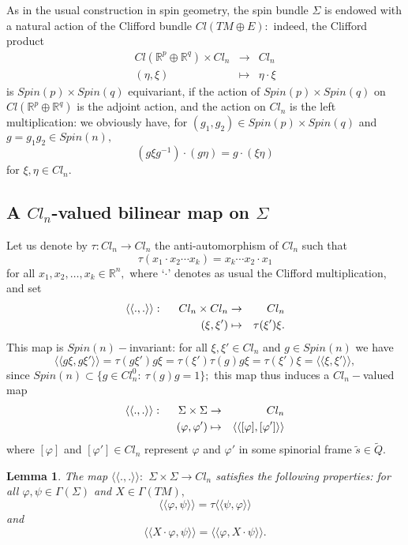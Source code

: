 \documentclass{amsart}
\newtheorem{lem}{Lemma}[section]
\begin{document}
As in the usual construction in spin geometry, the spin bundle $\Sigma$ is endowed with a natural action of the Clifford bundle $Cl(TM\oplus E):$ indeed, the Clifford product
\begin{eqnarray*}
Cl({\mathbb{R}}^p\oplus{\mathbb{R}}^q)\times Cl_n&\rightarrow& Cl_n\\
(\eta,\xi)&\mapsto& \eta\cdot\xi
\end{eqnarray*}
is $Spin(p)\times Spin(q)$ equivariant, if the action of $Spin(p)\times Spin(q)$ on $Cl({\mathbb{R}}^p\oplus{\mathbb{R}}^q)$ is the adjoint action, and the action on $Cl_n$ is the left multiplication: we obviously have, for $(g_1,g_2)\in Spin(p)\times Spin(q)$ and $g=g_1g_2\in Spin(n),$
$$(g\xi g^{-1})\cdot(g\eta)=g\cdot(\xi\eta)$$
for $\xi,\eta\in Cl_n.$ 

\subsection{A $Cl_n$-valued bilinear map on $\Sigma$}
Let us denote by $\tau:Cl_n\rightarrow Cl_n$ the anti-automorphism of $Cl_n$ such that
$$\tau(x_1\cdot x_2\cdots x_k)=x_k\cdots x_2\cdot x_1$$ 
for all $x_1,x_2,\ldots, x_k\in{\mathbb{R}}^n,$ where `$\cdot$'  denotes as usual the Clifford multiplication, and set
\begin{eqnarray}
\langle\langle.,.\rangle\rangle:\hspace{.5cm}Cl_n\times Cl_n&\rightarrow& Cl_n\label{def brackets 1}\\
(\xi,\xi')&\mapsto& \tau(\xi')\xi.\nonumber
\end{eqnarray}
This map is $Spin(n)-$invariant: for all $\xi,\xi'\in Cl_n$ and $g\in Spin(n)$ we have
$$\langle\langle g\xi,g\xi'\rangle\rangle=\tau(g\xi')g\xi= \tau(\xi')\tau(g)g\xi= \tau(\xi')\xi=\langle\langle \xi,\xi'\rangle\rangle,$$
since $Spin(n)\subset \{g\in Cl_n^0:\ \tau(g)g=1\};$ this map thus induces a $Cl_n-$valued map
\begin{eqnarray}
\langle\langle.,.\rangle\rangle:\hspace{.5cm}\Sigma\times \Sigma&\rightarrow& Cl_n\label{def brackets 2}\\
(\varphi,\varphi')&\mapsto& \langle\langle[\varphi],[\varphi']\rangle\rangle\nonumber
\end{eqnarray}
where $[\varphi]$ and $[\varphi']\in Cl_n$ represent $\varphi$ and $\varphi'$ in some spinorial frame $\tilde{s}\in\tilde{Q}.$
\begin{lem}
The map $\langle\langle.,.\rangle\rangle:$ $\Sigma\times \Sigma\rightarrow Cl_n$ satisfies the following properties: for all $\varphi,\psi\in\Gamma(\Sigma)$ and $X\in \Gamma(TM),$
\begin{equation}\label{scalar product property1}
\langle\langle \varphi,\psi\rangle\rangle=\tau\langle\langle\psi,\varphi\rangle\rangle
\end{equation}
and
\begin{equation}\label{scalar product property2}
\langle\langle X\cdot\varphi,\psi\rangle\rangle=\langle\langle\varphi,X\cdot \psi\rangle\rangle.
\end{equation}
\end{lem}
\end{document}
